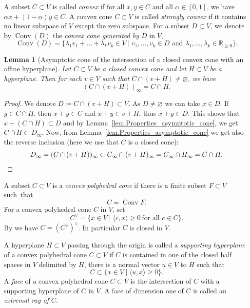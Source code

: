 \documentclass[JEP,XML,SOM,Unicode]{cedram}
\let\oldvee\vee
\renewcommand{\vee}{{\scriptscriptstyle\oldvee}}
\theoremstyle{plain}
\newtheorem{lemma}[theorem]{Lemma}
\theoremstyle{definition}
\DeclareMathOperator{\Conv}{Conv}
\newcommand{\RR}{\mathbb{R}}
\newcommand{\set}[2]{\{#1 \mid #2\}}
\begin{document}
A subset $C \subset V$ is called \emph{convex} if for all
$x, y \in C$ and all $\alpha \in [0, 1]$, we have $\alpha x + (1- \alpha) y \in C$.
A convex cone $C \subset V$ is called \emph{strongly convex} if
it contains no linear subspace of $V$ except the zero subspace.
For a
subset $D \subset V$, we denote by $\Conv(D)$ the
\emph{convex cone generated by $D$} in $V$, \ie
\[
\Conv(D) = \set{\lambda_1 v_1 + \ldots + \lambda_k v_k \in V}{
\textrm{$v_1, \ldots, v_k \in D$ and $\lambda_1, \ldots, \lambda_k \in \RR_{\geq 0}$}}.
\]

\begin{lemma}[Asymptotic cone of the intersection of a closed convex
cone with an affine hyperplane]
\label{lem.Weights_facet_translated}
Let $C \subset V$ be a closed convex cone and let
$H \subset V$ be a hyperplane. Then for each $v \in V$ such that $C \cap (v+H) \neq \varnothing$, we have
\[
\left( C \cap (v+H) \right)_{\infty} = C \cap H.
\]
\end{lemma}

\begin{proof}
We denote $D \coloneqq C \cap (v+H) \subset V$. As
$D \neq \varnothing$ we can take $x \in D$. If~$y \in C \cap H$, then
$x+y \in C$ and $x+y \in v + H$, thus $x+y \in D$. This shows that
$x + (C \cap H) \subset D$ and by Lemma~\ref{lem.Properties_asymptotic_cone}, we get $C \cap H \subset D_\infty$.
Now, from Lemma~\ref{lem.Properties_asymptotic_cone} we get also the reverse inclusion
(here we use that $C$ is a closed cone):
\[
D_\infty = (C \cap (v+H))_\infty \subset C_\infty \cap (v+H)_\infty
= C_\infty \cap H_{\infty} = C \cap H.\qedhere
\]
\end{proof}

A subset $C\!\subset\!V$ is a \emph{convex polyhedral cone} if there is a finite subset
$F\!\subset\!V$ such~that
\[
C = \Conv F.
\]
For a convex polyhedral cone $C$ in $V$, set
\[
C^\vee = \set{x \in V}{\langle c, x \rangle\geq 0 \ \textrm{for all $c \in C$}}.
\]
By \cite[Propty\,(1), p.\,9]{Fu1993Introduction-to-to} we have $C = (C^\vee)^\vee$.
In particular $C$ is closed in $V$.

A hyperplane $H \subset V$ passing through the origin is called a \emph{supporting hyperplane} of a convex polyhedral cone
$C \subset V$ if
$C$ is contained in one of the closed half spaces in $V$
delimited by $H$, \ie there is a normal vector $u \in V$ to $H$
such that
\[
C \subset \set{x \in V}{\langle u, x \rangle\geq 0}.
\]
A \emph{face} of a convex polyhedral cone $C \subset V$ is the intersection of $C$ with a
supporting hyperplane of $C$ in $V$.
A face of dimension one of $C$ is called an \emph{extremal ray of $C$}.
\end{document}
